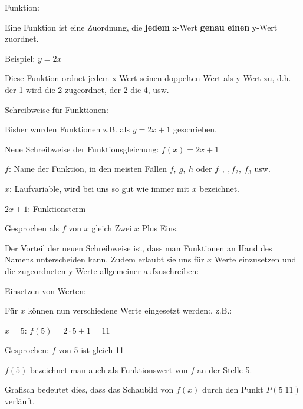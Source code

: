 \begin{tcolorbox}
	Funktion:

	\bigskip

	\textcolor{loestc}{Eine Funktion ist eine Zuordnung, die \textbf{jedem} x-Wert \textbf{genau einen} y-Wert zuordnet.
	}
\end{tcolorbox}
Beispiel: \(y=2x\)

\textcolor{loes}{Diese Funktion ordnet jedem x-Wert seinen doppelten Wert als y-Wert zu, d.h. der 1 wird die 2 zugeordnet, der 2 die 4, usw.}

\bigskip

\begin{tcolorbox}
	Schreibweise für Funktionen:

	\bigskip

	\textcolor{loestc}{Bisher wurden Funktionen z.B. als \(y=2x+1\) geschrieben.}

	\bigskip

	\textcolor{loestc}{Neue Schreibweise der Funktionsgleichung: \(f(x)=2x+1\)}

	\bigskip

	\textcolor{loestc}{\(f\): Name der Funktion, in den meisten Fällen \(f,\ g,\ h\) oder \(f_1,\ ,f_2,\ f_3\) usw.}

	\bigskip

	\textcolor{loestc}{\(x\): Laufvariable, wird bei uns so gut wie immer mit \(x\) bezeichnet.}

	\bigskip

	\textcolor{loestc}{\(2x+1\): Funktionsterm}

	\bigskip

	\textcolor{loestc}{Gesprochen als \(f\) von \(x\) gleich Zwei \(x\) Plus Eins.}
\end{tcolorbox}
Der Vorteil der neuen Schreibweise ist, dass man Funktionen an Hand des Namens unterscheiden kann. Zudem erlaubt sie uns für \(x\) Werte einzusetzen und die zugeordneten y-Werte allgemeiner aufzuschreiben:
\begin{tcolorbox}
	Einsetzen von Werten:

	\bigskip

	\textcolor{loestc}{Für \(x\) können nun verschiedene Werte eingesetzt werden:, z.B.:}

	\bigskip

	\textcolor{loestc}{\(x=5\): \(f(5)=2\cdot 5+1=11\)}

	\bigskip

	\textcolor{loestc}{Gesprochen: \(f\) von 5 ist gleich 11}

	\bigskip

	\textcolor{loestc}{\(f(5)\) bezeichnet man auch als Funktionswert von \(f\) an der Stelle 5.}

	\textcolor{loestc}{Grafisch bedeutet dies, dass das Schaubild von \(f(x)\) durch den Punkt \(P(5|11)\) verläuft.}
\end{tcolorbox}
